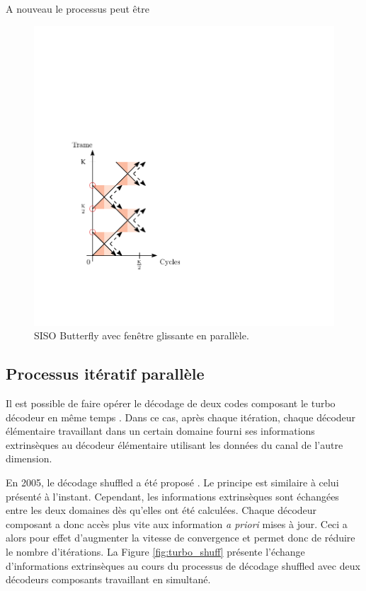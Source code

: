 A nouveau le processus peut être 

\begin{figure}[!h]
	\centering
	\includegraphics{main/ch4_fig/ipe/BFLY_SB_SW.pdf}
	\caption{SISO Butterfly avec fenêtre glissante en parallèle. \label{fig:sisos_par_sb}}
\end{figure}

\subsection{Processus itératif parallèle}
Il est possible de faire opérer le décodage de deux codes composant le turbo décodeur en même temps \cite{turbo_par}. 
Dans ce cas, après chaque itération, chaque décodeur élémentaire travaillant dans un certain domaine fourni ses 
informations extrinsèques au décodeur élémentaire utilisant les données du canal de l'autre dimension.

En 2005, le décodage shuffled a été proposé \cite{turbo_shuff}. Le principe est similaire à celui présenté à l'instant. 
Cependant, les informations extrinsèques sont échangées entre les deux domaines dès qu'elles ont été calculées. Chaque 
décodeur composant a donc accès plus vite aux information \textit{a priori} mises à jour. Ceci a alors pour effet
d'augmenter la vitesse de convergence et permet donc de réduire le nombre d'itérations. La Figure \ref{fig:turbo_shuff} 
présente l'échange d'informations extrinsèques au cours du processus de décodage shuffled avec deux décodeurs composants
travaillant en simultané.

